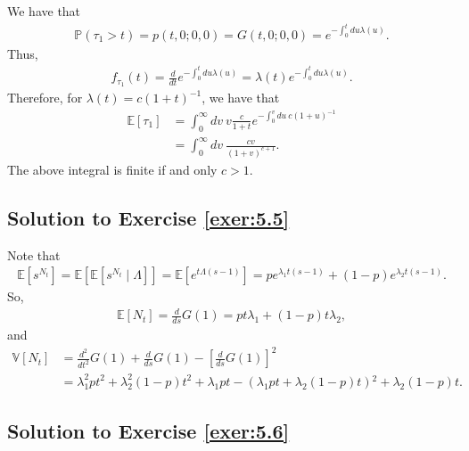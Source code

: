 \documentclass[12pt]{book}
\numberwithin{equation}{chapter}
\theoremstyle{plain}
\numberwithin{theorem}{section}
\theoremstyle{definition}
\numberwithin{exercise}{chapter}
\newcommand{\<}{\langle}
\renewcommand{\>}{\rangle}
\renewcommand{\(}{\left(}
\renewcommand{\)}{\right)}
\renewcommand{\[}{\left[}
\renewcommand{\]}{\right]}
\newcommand\Eb{\mathds{E}}
\newcommand\Pb{\mathds{P}}
\newcommand\Vb{\mathds{V}}
\begin{document}
We have that 
\begin{align}
\Pb (\tau_1 > t)
	= p(t,0;0,0)
	= G(t,0;0,0)
	= e^{- \int_0^t du \lambda(u)}.
\end{align}
Thus,
\begin{align}
f_{\tau_1}(t) 
	= \frac{d}{dt} e^{- \int_0^t du \lambda(u)}
	= \lambda(t) e^{- \int_0^t du \lambda(u)}.
\end{align}
Therefore, for $\lambda(t) = c(1 + t)^{-1}$, we have that
\begin{align}
\Eb[ \tau_1]
	&= \int_0^\infty dv\ v \frac{c}{1+t} e^{-\int_0^v du\ c (1 + u)^{-1}} \\
	&= \int_0^\infty dv\ \frac{c v}{(1 + v)^{c+1}}.
\end{align}
The above integral is finite if and only $c > 1$. 

\subsection*{Solution to Exercise \ref{exer:5.5}}
Note that
\begin{align}
\Eb[ s^{N_t} ]
	= \Eb[ \Eb[ s^{N_t} \mid \Lambda] ]
	= \Eb[ e^{ t \Lambda( s -1 )} ]
	= p e^{\lambda_1 t (s -1 )} + (1 - p ) e^{\lambda_2 t (s - 1) }.
\end{align}
So,
\begin{align}
\Eb[ N_t]
	= \frac{d}{ds} G(1)
	= p t \lambda_1 + (1 - p) t \lambda_2,
\end{align}
and
\begin{align}
\Vb [ N_t] 
	&= \frac{d^2}{dt^2} G(1) + \frac{d}{ds} G(1) - \[ \frac{d}{ds} G(1) \]^2 \\
	&= \lambda _1^2 p t^2+\lambda _2^2 (1-p) t^2+\lambda _1 p t-\left(\lambda _1 p t+\lambda _2 (1-p) 
t\right){}^2+\lambda _2 (1-p) t.
\end{align}

\subsection*{Solution to Exercise \ref{exer:5.6}}
\end{document}
